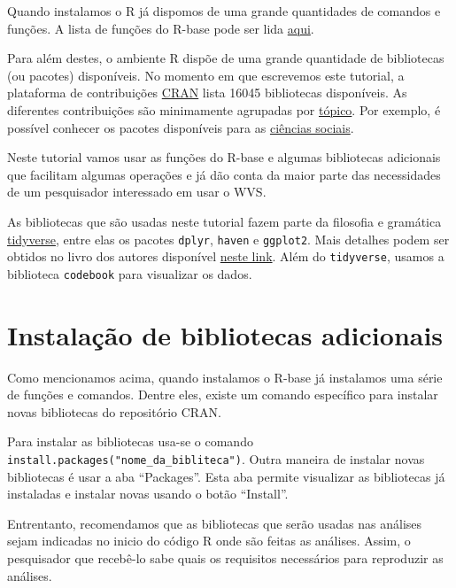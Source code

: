 \documentclass[
  brazil,
]{book}
\begin{document}
Quando instalamos o R já dispomos de uma grande quantidades de comandos e funções. A lista de funções do R-base pode ser lida \href{https://stat.ethz.ch/R-manual/R-devel/library/base/html/00Index.html}{aqui}.

Para além destes, o ambiente R dispõe de uma grande quantidade de bibliotecas (ou pacotes) disponíveis. No momento em que escrevemos este tutorial, a plataforma de contribuições \href{https://cran.r-project.org/web/packages/}{CRAN} lista 16045 bibliotecas disponíveis. As diferentes contribuições são minimamente agrupadas por \href{https://cran.r-project.org/web/views/}{tópico}. Por exemplo, é possível conhecer os pacotes disponíveis para as \href{https://cran.r-project.org/web/views/SocialSciences.html}{ciências sociais}.

Neste tutorial vamos usar as funções do R-base e algumas bibliotecas adicionais que facilitam algumas operações e já dão conta da maior parte das necessidades de um pesquisador interessado em usar o WVS.

As bibliotecas que são usadas neste tutorial fazem parte da filosofia e gramática \href{https://www.tidyverse.org/}{tidyverse}, entre elas os pacotes \texttt{dplyr}, \texttt{haven} e \texttt{ggplot2}. Mais detalhes podem ser obtidos no livro dos autores disponível \href{https://r4ds.had.co.nz/}{neste link}. Além do \texttt{tidyverse}, usamos a biblioteca \texttt{codebook} para visualizar os dados.

\hypertarget{instalauxe7uxe3o-de-bibliotecas-adicionais}{%
\section{Instalação de bibliotecas adicionais}\label{instalauxe7uxe3o-de-bibliotecas-adicionais}}

Como mencionamos acima, quando instalamos o R-base já instalamos uma série de funções e comandos. Dentre eles, existe um comando específico para instalar novas bibliotecas do repositório CRAN.

Para instalar as bibliotecas usa-se o comando \texttt{install.packages("nome\_da\_bibliteca")}. Outra maneira de instalar novas bibliotecas é usar a aba ``Packages''. Esta aba permite visualizar as bibliotecas já instaladas e instalar novas usando o botão ``Install''.

Entrentanto, recomendamos que as bibliotecas que serão usadas nas análises sejam indicadas no inicio do código R onde são feitas as análises. Assim, o pesquisador que recebê-lo sabe quais os requisitos necessários para reproduzir as análises.
\end{document}
